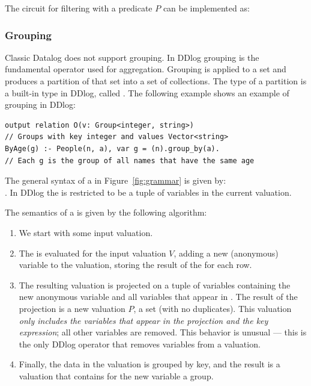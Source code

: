 The circuit for filtering with a predicate $P$ can be implemented as:


\subsubsection{Grouping}\label{sec:grouping}

Classic Datalog does not support grouping.
In DDlog grouping is the fundamental operator used for aggregation.
Grouping is applied to a set and produces a partition of that set
into a set of collections.  The type of a partition is a built-in
type in DDlog, called .
The following example shows an example of grouping in DDlog:

\begin{lstlisting}[language=ddlog]
output relation O(v: Group<integer, string>)
// Groups with key integer and values Vector<string>
ByAge(g) :- People(n, a), var g = (n).group_by(a).
// Each g is the group of all names that have the same age
\end{lstlisting}

The general syntax of a  in Figure~\ref{fig:grammar} is given by: \\
.
In DDlog the  is restricted to be a tuple
of variables in the current valuation.

The semantics of a  is given by the following algorithm:

\begin{enumerate}
    \item We start with some input valuation.
    \item The  is evaluated for the input valuation $V$,
    adding a new (anonymous) variable to the valuation, storing the result
    of the  for each row.
    \item The resulting valuation is projected on a tuple of variables containing
    the new anonymous variable and all variables that appear in .
    The result of the projection is a new valuation $P$, a set (with no duplicates).
    This valuation \emph{only includes the variables that appear in the projection and
    the key expression}; all other variables are removed.  This behavior is unusual ---
    this is the only DDlog operator that removes variables from a valuation.
    \item Finally, the data in the valuation is grouped by key,
    and the result is a valuation that contains for the new variable a group.
\end{enumerate}

